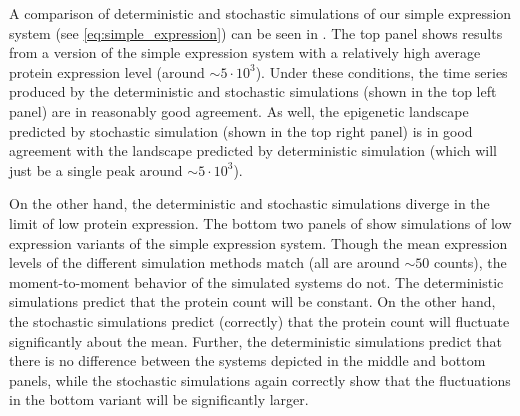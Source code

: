 A comparison of deterministic and stochastic simulations of our simple expression system (see \eqref{eq:simple_expression}) can be seen in . The top panel shows results from a version of the simple expression system with a relatively high average protein expression level (around ${\sim}5 \cdot 10^{3}$). Under these conditions, the time series produced by the deterministic and stochastic simulations (shown in the top left panel) are in reasonably good agreement. As well, the epigenetic landscape predicted by stochastic simulation (shown in the top right panel) is in good agreement with the landscape predicted by deterministic simulation (which will just be a single peak around ${\sim}5 \cdot 10^{3}$). 

On the other hand, the deterministic and stochastic simulations diverge in the limit of low protein expression. The bottom two panels of  show simulations of low expression variants of the simple expression system. Though the mean expression levels of the different simulation methods match (all are around ${\sim}50$ counts), the moment-to-moment behavior of the simulated systems do not. The deterministic simulations predict that the protein count will be constant. On the other hand, the stochastic simulations predict (correctly) that the protein count will fluctuate significantly about the mean. Further, the deterministic simulations predict that there is no difference between the systems depicted in the middle and bottom panels, while the stochastic simulations again correctly show that the fluctuations in the bottom variant will be significantly larger. 


